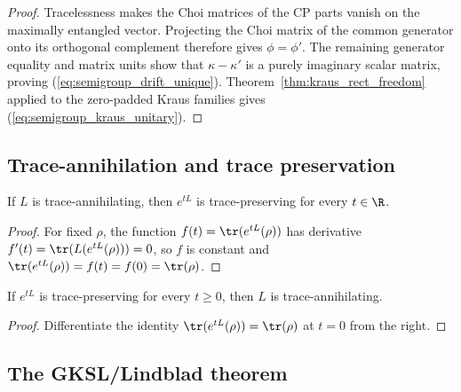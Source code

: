 \begin{proof}\leanok
    Tracelessness makes the Choi matrices of the CP parts vanish on the
    maximally entangled vector. Projecting the Choi matrix of the common
    generator onto its orthogonal complement therefore gives $\phi=\phi'$.
    The remaining generator equality and matrix units show that
    $\kappa-\kappa'$ is a purely imaginary scalar matrix, proving
    (\ref{eq:semigroup_drift_unique}). Theorem~\ref{thm:kraus_rect_freedom}
    applied to the zero-padded Kraus families gives
    (\ref{eq:semigroup_kraus_unitary}).
\end{proof}

\subsection{Trace-annihilation and trace preservation}

\begin{theorem}
    \label{thm:ta_implies_tp_semigroup}
    \leanok
    If $L$ is trace-annihilating, then $e^{tL}$ is trace-preserving for every
    $t \in \R$.
\end{theorem}

\begin{proof}
    \leanok
    For fixed $\rho$, the function $f(t)=\tr(e^{tL}(\rho))$ has derivative
    $f'(t)=\tr(L(e^{tL}(\rho)))=0$, so $f$ is constant and
    $\tr(e^{tL}(\rho))=f(t)=f(0)=\tr(\rho)$.
\end{proof}

\begin{theorem}
    \label{thm:tp_semigroup_implies_ta}
    \leanok
    If $e^{tL}$ is trace-preserving for every $t \ge 0$, then $L$ is
    trace-annihilating.
\end{theorem}

\begin{proof}
    \leanok
    Differentiate the identity $\tr(e^{tL}(\rho))=\tr(\rho)$ at $t=0$
    from the right.
\end{proof}

\subsection{The GKSL/Lindblad theorem}

